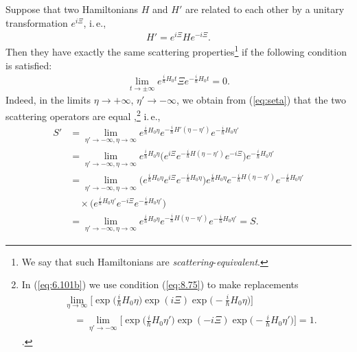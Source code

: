 \documentclass[]{stefan1}
\begin{document}
Suppose that two Hamiltonians $ H $ and $ H'$ are related to each other
by a unitary transformation $ e ^{i \Xi } $, i.\,e.,
%
\begin{align}
H' = e^{i\Xi } H e^{-i\Xi }. \label{eq:7.34a}
\end{align}
Then they have exactly the same scattering properties\footnote{We say
that such Hamiltonians are \emph{scattering}-\emph{equivalent}.}
 if the following condition is satisfied:\vadjust{\goodbreak}
%
\begin{align}
\lim_{t \to \pm \infty } e^{\frac{i}{\hbar }H_{0} t} \Xi e^{-\frac{i}{
\hbar }H_{0}t}= 0.
\label{eq:8.75}
\end{align}
Indeed, in the limits $\eta \to +\infty $, $\eta ' \to -\infty $, we
obtain from (\ref{eq:seta}) that the two scattering operators are equal
\cite{Ekstein},\footnote{In (\ref{eq:6.101b}) we use condition
(\ref{eq:8.75}) to make replacements
%
\begin{align*}
&\lim_{\eta \to \infty } \biggl[ \exp \biggl( \frac{i}{\hbar }H_{0}
\eta \biggr) \exp ( i\Xi ) \exp \biggl( -\frac{i}{\hbar }H _{0}\eta
\biggr) \biggr]
\\
&\quad = \lim_{\eta ' \to -\infty } \biggl[ \exp \biggl( \frac{i}{\hbar }H_{0}
\eta ' \biggr) \exp ( -i\Xi ) \exp \biggl( -\frac{i}{\hbar }H
_{0}\eta ' \biggr) \biggr] =1.
\end{align*}.\vspace*{-12pt}} i.\,e.,
%
\begin{align}
S' &= \lim_{\eta ' \to -\infty , \eta \to \infty } e^{\frac{i}{\hbar
}H_{0}\eta }
e^{-\frac{i}{\hbar }H' ( \eta - \eta ' ) } e^{-\frac{i}{
\hbar }H_{0} \eta '}
\nonumber
\\
&= \lim_{\eta ' \to -\infty , \eta \to \infty } e^{\frac{i}{\hbar }H
_{0}\eta } \bigl( e^{i\Xi }
e^{-\frac{i}{\hbar }H ( \eta -
\eta ' ) } e^{-i\Xi } \bigr) e^{-\frac{i}{\hbar }H_{0} \eta '}
\nonumber
\\
&=\lim_{\eta ' \to -\infty , \eta \to \infty } \bigl( e^{\frac{i}{
\hbar }H_{0}\eta } e^{i\Xi }
e^{-\frac{i}{\hbar }H_{0}\eta } \bigr) e ^{\frac{i}{\hbar }H_{0}\eta } e^{-\frac{i}{\hbar }H ( \eta -
\eta ' ) } e^{-\frac{i}{\hbar }H_{0} \eta '}
\nonumber
\\
&
\quad \times\bigl( e^{\frac{i}{\hbar }H_{0} \eta '} e^{-i\Xi } e^{-\frac{i}{
\hbar }H_{0}
\eta '} \bigr)
\label{eq:6.101b}
\\
&= \lim_{\eta ' \to -\infty , \eta \to \infty } e^{\frac{i}{\hbar }H
_{0}\eta } e^{-\frac{i}{\hbar }H ( \eta - \eta ' ) }
e^{-\frac{i}{
\hbar }H_{0}\eta '} = S. \label{eq:6.101a}
\end{align}
\end{document}
